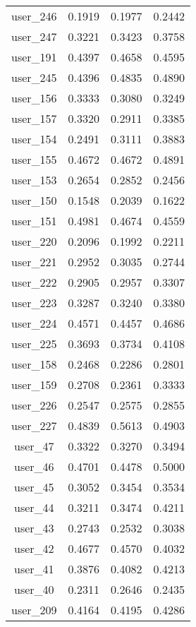 \begin{table}[ht]
\begin{tabular}{|c|c|c|c|}
user_246  &  0.1919   &  0.1977   &  0.2442 \\ 
user_247  &  0.3221   &  0.3423   &  0.3758 \\ 
user_191  &  0.4397   &  0.4658   &  0.4595 \\ 
user_245  &  0.4396   &  0.4835   &  0.4890 \\ 
user_156  &  0.3333   &  0.3080   &  0.3249 \\ 
user_157  &  0.3320   &  0.2911   &  0.3385 \\ 
user_154  &  0.2491   &  0.3111   &  0.3883 \\ 
user_155  &  0.4672   &  0.4672   &  0.4891 \\ 
user_153  &  0.2654   &  0.2852   &  0.2456 \\ 
user_150  &  0.1548   &  0.2039   &  0.1622 \\ 
user_151  &  0.4981   &  0.4674   &  0.4559 \\ 
user_220  &  0.2096   &  0.1992   &  0.2211 \\ 
user_221  &  0.2952   &  0.3035   &  0.2744 \\ 
user_222  &  0.2905   &  0.2957   &  0.3307 \\ 
user_223  &  0.3287   &  0.3240   &  0.3380 \\ 
user_224  &  0.4571   &  0.4457   &  0.4686 \\ 
user_225  &  0.3693   &  0.3734   &  0.4108 \\ 
user_158  &  0.2468   &  0.2286   &  0.2801 \\ 
user_159  &  0.2708   &  0.2361   &  0.3333 \\ 
user_226  &  0.2547   &  0.2575   &  0.2855 \\ 
user_227  &  0.4839   &  0.5613   &  0.4903 \\ 
user_47  &  0.3322   &  0.3270   &  0.3494 \\ 
user_46  &  0.4701   &  0.4478   &  0.5000 \\ 
user_45  &  0.3052   &  0.3454   &  0.3534 \\ 
user_44  &  0.3211   &  0.3474   &  0.4211 \\ 
user_43  &  0.2743   &  0.2532   &  0.3038 \\ 
user_42  &  0.4677   &  0.4570   &  0.4032 \\ 
user_41  &  0.3876   &  0.4082   &  0.4213 \\ 
user_40  &  0.2311   &  0.2646   &  0.2435 \\ 
user_209  &  0.4164   &  0.4195   &  0.4286 \\ 

\end{tabular}
\end{table}
